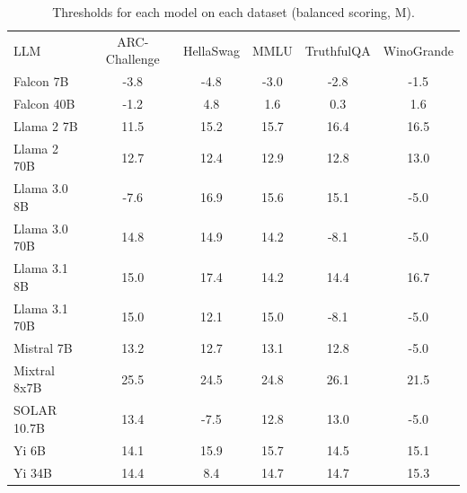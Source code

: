 \begin{table}[h]
\caption{Thresholds for each model on each dataset (balanced scoring, M). }
\label{tab:thresholds_logit_max_k20_w1}
\centering
\begin{tabular}{l S[table-format=3.1] S[table-format=3.1] S[table-format=3.1] S[table-format=3.1] S[table-format=3.1]}
\toprule
LLM & ARC-Challenge & HellaSwag & MMLU & TruthfulQA & WinoGrande \\ 
\cmidrule(lr){1-1} \cmidrule(lr){2-2} \cmidrule(lr){3-3} \cmidrule(lr){4-4} \cmidrule(lr){5-5} \cmidrule(lr){6-6}
Falcon 7B & -3.8 & -4.8 & -3.0 & -2.8 & -1.5\\
Falcon 40B & -1.2 & 4.8 & 1.6 & 0.3 & 1.6\\
Llama 2 7B & 11.5 & 15.2 & 15.7 & 16.4 & 16.5\\
Llama 2 70B & 12.7 & 12.4 & 12.9 & 12.8 & 13.0\\
Llama 3.0 8B & -7.6 & 16.9 & 15.6 & 15.1 & -5.0\\
Llama 3.0 70B & 14.8 & 14.9 & 14.2 & -8.1 & -5.0\\
Llama 3.1 8B & 15.0 & 17.4 & 14.2 & 14.4 & 16.7\\
Llama 3.1 70B & 15.0 & 12.1 & 15.0 & -8.1 & -5.0\\
Mistral 7B & 13.2 & 12.7 & 13.1 & 12.8 & -5.0\\
Mixtral 8x7B & 25.5 & 24.5 & 24.8 & 26.1 & 21.5\\
SOLAR 10.7B & 13.4 & -7.5 & 12.8 & 13.0 & -5.0\\
Yi 6B & 14.1 & 15.9 & 15.7 & 14.5 & 15.1\\
Yi 34B & 14.4 & 8.4 & 14.7 & 14.7 & 15.3\\
\bottomrule
\end{tabular}
\end{table}
